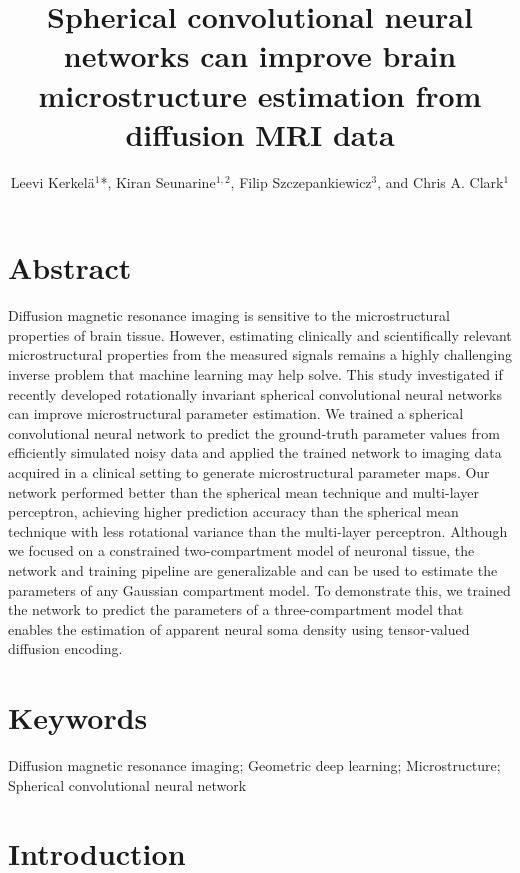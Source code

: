 \documentclass[10pt, letterpaper, oneside]{article}
\title{
	\textbf{Spherical convolutional neural networks can improve brain microstructure estimation from diffusion MRI data}
}
\author{
	Leevi Kerkelä$^1$*, Kiran Seunarine$^{1,2}$, Filip Szczepankiewicz$^3$, and Chris A. Clark$^1$
}
\date{
	\begin{flushleft}
	\scriptsize{
	    $^1$ UCL Great Ormond Street Institute of Child Health, University College London, London, United Kingdom \\
		$^2$ Great Ormond Street Hospital, London, United Kingdom \\
		$^3$ Medical Radiation Physics, Clinical Sciences Lund, Lund University, Lund, Sweden \\
		[2ex]
		* Corresponding author: leevi.kerkela.17@ucl.ac.uk; Developmental Imaging \& Biophysics Section, UCL Great Ormond Street Institute of Child Health, 30 Guilford Street, WC1N 1EH, London, United Kingdom
	}
    \end{flushleft}
}
\begin{document}
\maketitle

\section*{Abstract}

Diffusion magnetic resonance imaging is sensitive to the microstructural properties of brain tissue. However, estimating clinically and scientifically relevant microstructural properties from the measured signals remains a highly challenging inverse problem that machine learning may help solve. This study investigated if recently developed rotationally invariant spherical convolutional neural networks can improve microstructural parameter estimation. We trained a spherical convolutional neural network to predict the ground-truth parameter values from efficiently simulated noisy data and applied the trained network to imaging data acquired in a clinical setting to generate microstructural parameter maps. Our network performed better than the spherical mean technique and multi-layer perceptron, achieving higher prediction accuracy than the spherical mean technique with less rotational variance than the multi-layer perceptron. Although we focused on a constrained two-compartment model of neuronal tissue, the network and training pipeline are generalizable and can be used to estimate the parameters of any Gaussian compartment model. To demonstrate this, we trained the network to predict the parameters of a three-compartment model that enables the estimation of apparent neural soma density using tensor-valued diffusion encoding.

\section*{Keywords}

Diffusion magnetic resonance imaging; Geometric deep learning; Microstructure; Spherical convolutional neural network

\thispagestyle{empty}

\newpage


\section{Introduction}
\end{document}
